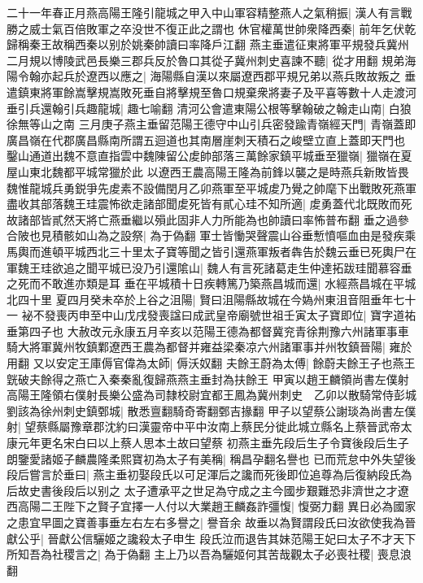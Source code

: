 二十一年春正月燕高陽王隆引龍城之甲入中山軍容精整燕人之氣稍振|{
	漢人有言戰勝之威士氣百倍敗軍之卒没世不復正此之謂也}
休官權萬世帥衆降西秦|{
	前年乞伏乾歸稱秦王故稱西秦以别於姚秦帥讀曰率降戶江翻}
燕主垂遣征東將軍平規發兵冀州二月規以博陵武邑長樂三郡兵反於魯口其從子冀州刺史喜諫不聽|{
	從才用翻}
規弟海陽令翰亦起兵於遼西以應之|{
	海陽縣自漢以來屬遼西郡平規兄弟以燕兵敗故叛之}
垂遣鎮東將軍餘嵩擊規嵩敗死垂自將擊規至魯口規棄衆將妻子及平喜等數十人走渡河垂引兵還翰引兵趣龍城|{
	趣七喻翻}
清河公會遣東陽公根等擊翰破之翰走山南|{
	白狼徐無等山之南}
三月庚子燕主垂留范陽王德守中山引兵密發踰青嶺經天門|{
	青嶺蓋即廣昌嶺在代郡廣昌縣南所謂五迴道也其南層崖刺天積石之峻壁立直上蓋即天門也}
鑿山通道出魏不意直指雲中魏陳留公䖍帥部落三萬餘家鎮平城垂至獵嶺|{
	獵嶺在夏屋山東北魏都平城常獵於此}
以遼西王農高陽王隆為前鋒以襲之是時燕兵新敗皆畏魏惟龍城兵勇鋭爭先䖍素不設備閏月乙卯燕軍至平城䖍乃覺之帥麾下出戰敗死燕軍盡收其部落魏王珪震怖欲走諸部聞䖍死皆有貳心珪不知所適|{
	䖍勇蓋代北既敗而死故諸部皆貳然天將亡燕垂繼以殞此固非人力所能為也帥讀曰率怖普布翻}
垂之過參合陂也見積骸如山為之設祭|{
	為于偽翻}
軍士皆慟哭聲震山谷垂慙憤嘔血由是發疾乘馬輿而進頓平城西北三十里太子寶等聞之皆引還燕軍叛者犇告於魏云垂已死輿尸在軍魏王珪欲追之聞平城已没乃引還隂山|{
	魏人有言死諸葛走生仲達拓跋珪聞慕容垂之死而不敢進亦類是耳}
垂在平城積十日疾轉篤乃築燕昌城而還|{
	水經燕昌城在平城北四十里}
夏四月癸未卒於上谷之沮陽|{
	賢曰沮陽縣故城在今媯州東沮音阻垂年七十一}
袐不發喪丙申至中山戊戌發喪諡曰成武皇帝廟號世祖壬寅太子寶即位|{
	寶字道祐垂第四子也}
大赦改元永康五月辛亥以范陽王德為都督冀兖青徐荆豫六州諸軍事車騎大將軍冀州牧鎮鄴遼西王農為都督并雍益梁秦凉六州諸軍事并州牧鎮晉陽|{
	雍於用翻}
又以安定王庫傉官偉為太師|{
	傉沃奴翻}
夫餘王蔚為太傅|{
	餘蔚夫餘王子也燕王皝破夫餘得之燕亡入秦秦亂復歸燕燕主垂封為扶餘王}
甲寅以趙王麟領尚書左僕射高陽王隆領右僕射長樂公盛為司隸校尉宜都王鳳為冀州刺史　乙卯以散騎常侍彭城劉該為徐州刺史鎮鄄城|{
	散悉亶翻騎奇寄翻鄄吉掾翻}
甲子以望蔡公謝琰為尚書左僕射|{
	望蔡縣屬豫章郡沈約曰漢靈帝中平中汝南上蔡民分徙此城立縣名上蔡晉武帝太康元年更名宋白曰以上蔡人思本土故曰望蔡}
初燕主垂先段后生子令寶後段后生子朗鑒愛諸姬子麟農隆柔熙寶初為太子有美稱|{
	稱昌孕翻名譽也}
已而荒怠中外失望後段后嘗言於垂曰|{
	燕主垂初娶段氏以可足渾后之讒而死後即位追尊為后復納段氏為后故史書後段后以别之}
太子遭承平之世足為守成之主今國步艱難恐非濟世之才遼西高陽二王陛下之賢子宜擇一人付以大業趙王麟姦詐彊愎|{
	愎弼力翻}
異日必為國家之患宜早圖之寶善事垂左右左右多譽之|{
	譽音余}
故垂以為賢謂段氏曰汝欲使我為晉獻公乎|{
	晉獻公信驪姬之讒殺太子申生}
段氏泣而退告其妹范陽王妃曰太子不才天下所知吾為社稷言之|{
	為于偽翻}
主上乃以吾為驪姬何其苦哉觀太子必喪社稷|{
	喪息浪翻}

